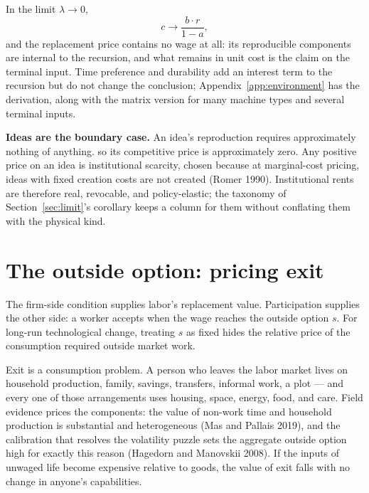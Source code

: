 \documentclass[12pt]{article}
\theoremstyle{plain}
\begin{document}
In the limit $\lambda\to0$,
\begin{equation}\label{eq:lambda-zero}
c \to \frac{b\cdot r}{1-a},
\end{equation}
and the replacement price contains no wage at all: its reproducible components
are internal to the recursion, and what remains in unit cost is the claim on the
terminal input. Time preference and durability add an interest term to the
recursion but do not change the conclusion; Appendix~\ref{app:environment} has
the derivation, along with the matrix version for many machine types and several
terminal inputs.

\textbf{Ideas are the boundary case.} An idea's reproduction requires
approximately nothing of anything. so its competitive price is approximately zero. Any positive
price on an idea is institutional scarcity, chosen because at marginal-cost
pricing, ideas with fixed creation costs are not created (Romer 1990).
Institutional rents are therefore real, revocable, and policy-elastic; the
taxonomy of Section~\ref{sec:limit}'s corollary keeps a column for them
without conflating them with the physical kind.

\section{The outside option: pricing exit}\label{sec:floor}

The firm-side condition supplies labor's replacement value. Participation supplies the other side: a worker accepts when the wage reaches the outside option $s$. For long-run technological change, treating $s$ as fixed hides the relative price of the consumption required outside market work.

Exit is a consumption problem. A person who leaves the labor market lives on
household production, family, savings, transfers, informal work, a plot --- and
every one of those arrangements uses housing, space, energy, food, and care.
Field evidence prices the components: the value of non-work time and household
production is substantial and heterogeneous (Mas and Pallais 2019), and the
calibration that resolves the volatility puzzle sets the aggregate outside
option high for exactly this reason (Hagedorn and Manovskii 2008). If the inputs
of unwaged life become expensive relative to goods, the value of exit falls with
no change in anyone's capabilities.
\end{document}
